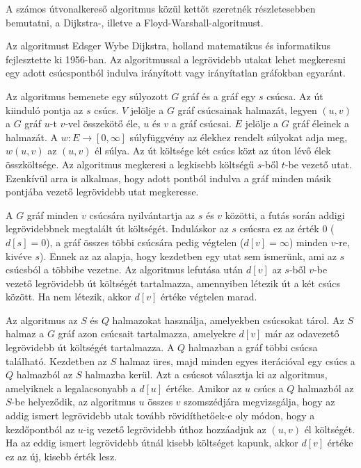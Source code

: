 
A számos útvonalkereső algoritmus közül kettőt szeretnék részletesebben bemutatni, a Dijkstra-, illetve a Floyd-Warshall-algoritmust.


Az algoritmust Edsger Wybe Dijkstra, holland matematikus és informatikus fejlesztette ki 1956-ban. Az algoritmussal a legrövidebb utakat lehet megkeresni egy adott csúcspontból indulva irányított vagy irányítatlan gráfokban egyaránt.

Az algoritmus bemenete egy súlyozott $G$ gráf és a gráf egy $s$ csúcsa. Az út kiinduló pontja az $s$ csúcs. $V$ jelölje a $G$ gráf csúcsainak halmazát, legyen $(u, v)$ a $G$ gráf $u$-t $v$-vel összekötő éle, $u$ és $v$ a gráf csúcsai. $E$ jelölje a $G$ gráf éleinek a halmazát. A $w: E \rightarrow [0, \infty]$ súlyfüggvény az élekhez rendelt súlyokat adja meg, $w(u, v)$ az $(u, v)$ él súlya. Az út költsége két csúcs közt az úton lévő élek összköltsége. Az algoritmus megkeresi a legkisebb költségű $s$-ből $t$-be vezető utat. Ezenkívül arra is alkalmas, hogy adott pontból indulva a gráf minden másik pontjába vezető legrövidebb utat megkeresse.

A $G$ gráf minden $v$ csúcsára nyilvántartja az $s$ és $v$ közötti, a futás során addigi legrövidebbnek megtalált út költségét. Induláskor az $s$ csúcsra ez az érték $0$ ($d[s] = 0$), a gráf összes többi csúcsára pedig végtelen ($d[v] = \infty$) minden $v$-re, kivéve $s$). Ennek az az alapja, hogy kezdetben egy utat sem ismerünk, ami az $s$ csúcsból a többibe vezetne. Az algoritmus lefutása után $d[v]$ az $s$-ből $v$-be vezető legrövidebb út költségét tartalmazza, amennyiben létezik út a két csúcs között. Ha nem létezik, akkor $d[v]$ értéke végtelen marad.

Az algoritmus az $S$ és $Q$ halmazokat használja, amelyekben csúcsokat tárol. Az $S$ halmaz a $G$ gráf azon csúcsait tartalmazza, amelyekre $d[v]$ már az odavezető legrövidebb út költségét tartalmazza. A $Q$ halmazban a gráf többi csúcsa található. Kezdetben az $S$ halmaz üres, majd minden egyes iterációval egy csúcs a $Q$ halmazból az $S$ halmazba kerül. Azt a csúcsot választja ki az algoritmus, amelyiknek a legalacsonyabb a $d[u]$ értéke. Amikor az $u$ csúcs a $Q$ halmazból az $S$-be helyeződik, az algoritmus $u$ összes $v$ szomszédjára megvizsgálja, hogy az addig ismert legrövidebb utak tovább rövidíthetőek-e oly módon, hogy a kezdőpontból az $u$-ig vezető legrövidebb úthoz hozzáadjuk az $(u, v)$ él költségét. Ha az eddig ismert legrövidebb útnál kisebb költséget kapunk, akkor $d[v]$ értéke ez az új, kisebb érték lesz.

